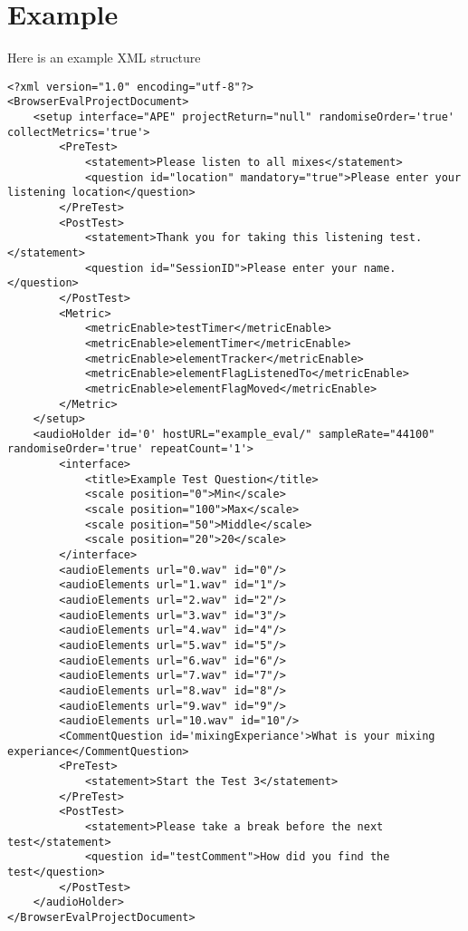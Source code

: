 \documentclass{article}
\begin{document}
\section{Example}

Here is an example XML structure

\begin{lstlisting}
<?xml version="1.0" encoding="utf-8"?>
<BrowserEvalProjectDocument>
	<setup interface="APE" projectReturn="null" randomiseOrder='true' collectMetrics='true'>
		<PreTest>
			<statement>Please listen to all mixes</statement>
			<question id="location" mandatory="true">Please enter your listening location</question>
		</PreTest>
		<PostTest>
			<statement>Thank you for taking this listening test.</statement>
			<question id="SessionID">Please enter your name.</question>
		</PostTest>
		<Metric>
			<metricEnable>testTimer</metricEnable>
			<metricEnable>elementTimer</metricEnable>
			<metricEnable>elementTracker</metricEnable>
			<metricEnable>elementFlagListenedTo</metricEnable>
			<metricEnable>elementFlagMoved</metricEnable>
		</Metric>
	</setup>
	<audioHolder id='0' hostURL="example_eval/" sampleRate="44100" randomiseOrder='true' repeatCount='1'>
		<interface>
			<title>Example Test Question</title>
			<scale position="0">Min</scale>
			<scale position="100">Max</scale>
			<scale position="50">Middle</scale>
			<scale position="20">20</scale>
		</interface>
		<audioElements url="0.wav" id="0"/>
		<audioElements url="1.wav" id="1"/>
		<audioElements url="2.wav" id="2"/>
		<audioElements url="3.wav" id="3"/>
		<audioElements url="4.wav" id="4"/>
		<audioElements url="5.wav" id="5"/>
		<audioElements url="6.wav" id="6"/>
		<audioElements url="7.wav" id="7"/>
		<audioElements url="8.wav" id="8"/>
		<audioElements url="9.wav" id="9"/>
		<audioElements url="10.wav" id="10"/>
		<CommentQuestion id='mixingExperiance'>What is your mixing experiance</CommentQuestion>
		<PreTest>
			<statement>Start the Test 3</statement>
		</PreTest>
		<PostTest>
			<statement>Please take a break before the next test</statement>
			<question id="testComment">How did you find the test</question>
		</PostTest>
	</audioHolder>
</BrowserEvalProjectDocument>
\end{lstlisting}
\end{document}
